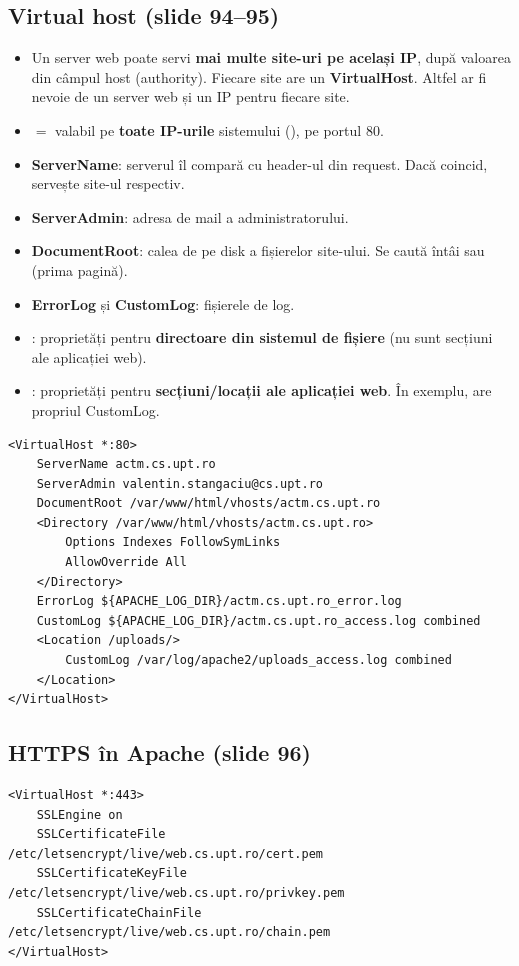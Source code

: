 \documentclass[11pt,a4paper]{article}
\begin{document}
\subsection*{Virtual host (slide 94--95)}
\begin{itemize}
  \item Un server web poate servi \textbf{mai multe site-uri pe același IP}, după valoarea din câmpul host (authority). Fiecare site are un \textbf{VirtualHost}. Altfel ar fi nevoie de un server web și un IP pentru fiecare site.
  \item {} $=$ valabil pe \textbf{toate IP-urile} sistemului (\cod{*}), pe portul 80.
  \item \textbf{ServerName}: serverul îl compară cu header-ul  din request. Dacă coincid, servește site-ul respectiv.
  \item \textbf{ServerAdmin}: adresa de mail a administratorului.
  \item \textbf{DocumentRoot}: calea de pe disk a fișierelor site-ului. Se caută întâi  sau  (prima pagină).
  \item \textbf{ErrorLog} și \textbf{CustomLog}: fișierele de log.
  \item \textbf{}: proprietăți pentru \textbf{directoare din sistemul de fișiere} (nu sunt secțiuni ale aplicației web).
  \item \textbf{}: proprietăți pentru \textbf{secțiuni/locații ale aplicației web}. În exemplu,  are propriul CustomLog.
\end{itemize}
\begin{lstlisting}
<VirtualHost *:80>
    ServerName actm.cs.upt.ro
    ServerAdmin valentin.stangaciu@cs.upt.ro
    DocumentRoot /var/www/html/vhosts/actm.cs.upt.ro
    <Directory /var/www/html/vhosts/actm.cs.upt.ro>
        Options Indexes FollowSymLinks
        AllowOverride All
    </Directory>
    ErrorLog ${APACHE_LOG_DIR}/actm.cs.upt.ro_error.log
    CustomLog ${APACHE_LOG_DIR}/actm.cs.upt.ro_access.log combined
    <Location /uploads/>
        CustomLog /var/log/apache2/uploads_access.log combined
    </Location>
</VirtualHost>
\end{lstlisting}


\subsection*{HTTPS în Apache (slide 96)}
\begin{lstlisting}
<VirtualHost *:443>
    SSLEngine on
    SSLCertificateFile      /etc/letsencrypt/live/web.cs.upt.ro/cert.pem
    SSLCertificateKeyFile   /etc/letsencrypt/live/web.cs.upt.ro/privkey.pem
    SSLCertificateChainFile /etc/letsencrypt/live/web.cs.upt.ro/chain.pem
</VirtualHost>
\end{lstlisting}
\end{document}
